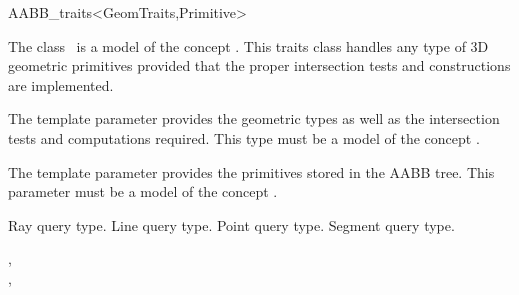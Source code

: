 \ccRefPageBegin


\begin{ccRefClass}{AABB_traits<GeomTraits,Primitive>}


\ccDefinition
  
The class \ccRefName\ is a model of the concept . This traits class handles any type of 3D geometric primitives provided that the proper intersection tests and constructions are implemented.

\ccParameters
The template parameter  provides the geometric types as well as the intersection tests and computations required. This type must be a model of the concept .

The template parameter  provides the primitives stored in the AABB tree. This parameter must be a model of the concept .


\ccTypes

          {Ray query type.}
          {Line query type.}
          {Point query type.}
          {Segment query type.}

\ccCreation
{} 

\ccSeeAlso

,\\
, \\
\\


\end{ccRefClass}

\ccRefPageEnd

